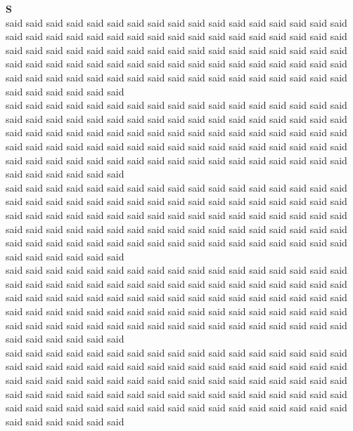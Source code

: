 \vspace{14pt}
\noindent\textbf{\Large S}\\[+12pt]
said said said said said said said said said said said said said said said said said said said said said said said said said said said said said said said said said said said said said said said said said said said said said said said said said said said said said said said said said said said said said said said said said said said said said said said said said said said said said said said said said said said said said said said said said said said\\
said said said said said said said said said said said said said said said said said said said said said said said said said said said said said said said said said said said said said said said said said said said said said said said said said said said said said said said said said said said said said said said said said said said said said said said said said said said said said said said said said said said said said said said said said said said\\
said said said said said said said said said said said said said said said said said said said said said said said said said said said said said said said said said said said said said said said said said said said said said said said said said said said said said said said said said said said said said said said said said said said said said said said said said said said said said said said said said said said said said said said said said said said\\
said said said said said said said said said said said said said said said said said said said said said said said said said said said said said said said said said said said said said said said said said said said said said said said said said said said said said said said said said said said said said said said said said said said said said said said said said said said said said said said said said said said said said said said said said said said\\
said said said said said said said said said said said said said said said said said said said said said said said said said said said said said said said said said said said said said said said said said said said said said said said said said said said said said said said said said said said said said said said said said said said said said said said said said said said said said said said said said said said said said said said said said said said\\
